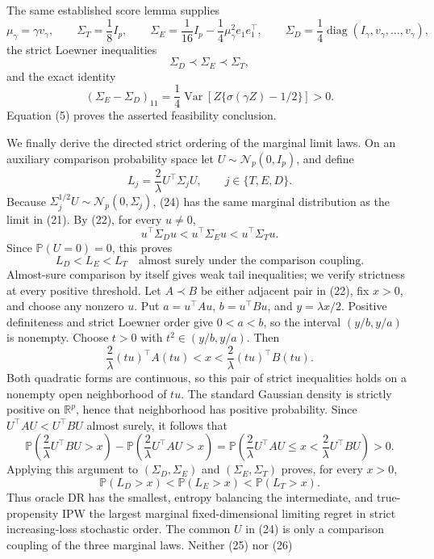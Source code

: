 The same established score lemma supplies
\[
 \mu_\gamma=\gamma v_\gamma,
 \qquad
 \Sigma_T=\frac18I_p,
 \qquad
 \Sigma_E=\frac1{16}I_p-\frac14\mu_\gamma^2e_1e_1^\top,
 \qquad
 \Sigma_D=\frac14\operatorname{diag}
 (I_\gamma,v_\gamma,\ldots,v_\gamma),
\]
the strict Loewner inequalities
\[
 \Sigma_D\prec\Sigma_E\prec\Sigma_T,
 \tag{22}
\]
and the exact identity
\[
 (\Sigma_E-\Sigma_D)_{11}
 =\frac14\operatorname{Var}
 \!\left[Z\{\sigma(\gamma Z)-1/2\}\right]>0.
 \tag{23}
\]
Equation (5) proves the asserted feasibility conclusion.

We finally derive the directed strict ordering of the marginal limit laws.
On an auxiliary comparison probability space let
\(U\sim\mathcal N_p(0,I_p)\), and define
\[
 L_j=\frac2\lambda U^\top\Sigma_jU,
 \qquad j\in\{T,E,D\}.
 \tag{24}
\]
Because \(\Sigma_j^{1/2}U\sim\mathcal N_p(0,\Sigma_j)\), (24) has the same
marginal distribution as the limit in (21).  By (22), for every
\(u\ne0\),
\[
 u^\top\Sigma_Du<u^\top\Sigma_Eu<u^\top\Sigma_Tu.
\]
Since \(\mathbb P(U=0)=0\), this proves
\[
 L_D<L_E<L_T\quad\text{almost surely under the comparison coupling}.
 \tag{25}
\]
Almost-sure comparison by itself gives weak tail inequalities; we verify
strictness at every positive threshold.  Let \(A\prec B\) be either adjacent
pair in (22), fix \(x>0\), and choose any nonzero \(u\).  Put
\(a=u^\top Au\), \(b=u^\top Bu\), and \(y=\lambda x/2\).  Positive
definiteness and strict Loewner order give \(0<a<b\), so the interval
\((y/b,y/a)\) is nonempty.  Choose \(t>0\) with
\(t^2\in(y/b,y/a)\).  Then
\[
 \frac2\lambda (tu)^\top A(tu)<x<
 \frac2\lambda (tu)^\top B(tu).
\]
Both quadratic forms are continuous, so this pair of strict inequalities
holds on a nonempty open neighborhood of \(tu\).  The standard Gaussian
density is strictly positive on \(\mathbb R^p\), hence that neighborhood has
positive probability.  Since
\(U^\top AU<U^\top BU\) almost surely, it follows that
\[
 \mathbb P\!\left(\frac2\lambda U^\top BU>x\right)
 -\mathbb P\!\left(\frac2\lambda U^\top AU>x\right)
 =\mathbb P\!\left(
   \frac2\lambda U^\top AU\le x<\frac2\lambda U^\top BU
  \right)>0.
\]
Applying this argument to \((\Sigma_D,\Sigma_E)\) and
\((\Sigma_E,\Sigma_T)\) proves, for every \(x>0\),
\[
 \mathbb P(L_D>x)<\mathbb P(L_E>x)<\mathbb P(L_T>x).
 \tag{26}
\]
Thus oracle DR has the smallest, entropy balancing the intermediate, and
true-propensity IPW the largest marginal fixed-dimensional limiting regret in
strict increasing-loss stochastic order.  The common \(U\) in (24) is only a
comparison coupling of the three marginal laws.  Neither (25) nor (26)
